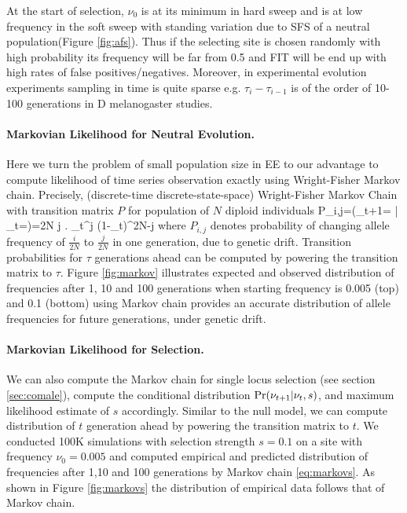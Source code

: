 \documentclass[11pt]{article}
\begin{document}
At the start of selection, $\nu_0$ is at its minimum in hard sweep and is at 
low frequency in the soft sweep with standing variation due to SFS of a neutral 
population(Figure \ref{fig:afs}). Thus if the selecting 
site is chosen randomly 
with high probability its frequency will be far from 0.5 and FIT will be end up 
with high rates of false positives/negatives. 
Moreover, in experimental evolution experiments sampling in time is quite 
sparse e.g. $\tau_i-\tau_{i-1}$ is of the order of 10-100 generations in D 
melanogaster studies.

\paragraph{Markovian Likelihood for Neutral Evolution.}
Here we turn the problem of small population size in EE to our advantage to 
compute likelihood of time series observation exactly using Wright-Fisher 
Markov chain.
Precisely,
(discrete-time discrete-state-space) Wright-Fisher Markov Chain with 
transition matrix $P$ for population of $N$ diploid individuals
\beq
P_{i,j}=\pr\left(\nu_{t+1}= \left| 
\nu_{t}=\right)={2N 
	\choose j} \right. 
\nu_{t}^j (1-\nu_{t})^{2N-j}  
\eeq
where $P_{i,j}$ denotes probability of 
changing allele frequency of $\frac{i}{2N}$ to $\frac{j}{2N}$ in one 
generation, due to genetic drift.
Transition probabilities for $\tau$ generations ahead 
can be computed by 
powering the transition matrix to $\tau$.
Figure \ref{fig:markov} illustrates expected and observed distribution of 
frequencies after 
1, 10 and 100 generations when starting frequency is 0.005 (top) and 0.1 
(bottom) using Markov chain provides an accurate distribution of 
allele frequencies 
for future generations, under genetic drift.

\paragraph{Markovian Likelihood for Selection.}
We can also compute the Markov chain for single locus selection (see section 
\ref{sec:comale}), compute the conditional distribution 
$\operatorname{Pr}(\nu_{t+1}|\nu_{t},s)$, and maximum likelihood estimate of $s$ accordingly. 
Similar to the null model, we can compute distribution of $t$ generation ahead 
by powering the transition matrix to $t$.
We conducted 100K simulations with selection strength $s=0.1$ on a site with 
frequency $\nu_0=0.005$ and computed empirical and predicted distribution of 
frequencies after 1,10 and 100 generations by Markov chain \eqref{eq:markovs}. 
As shown in Figure \ref{fig:markovs} the distribution of empirical data follows 
that of Markov chain.
\end{document}

